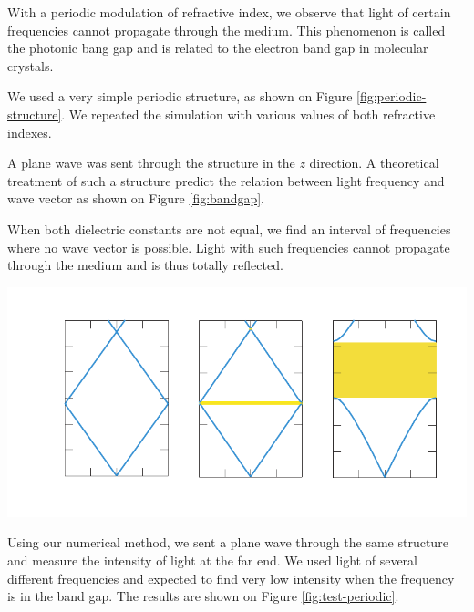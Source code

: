 \documentclass[a4paper,10pt]{article}
\renewenvironment{figure}
  {\par\medskip\noindent\minipage{\linewidth}}
  {\endminipage\par\medskip}
\begin{document}
\begin{multicols}{2}
With a periodic modulation of refractive index, we observe that light of certain frequencies cannot propagate through the medium\cite{hecht-nano,joannopoulos}. 
This phenomenon is called the photonic bang gap and is related to the electron band gap in molecular crystals. 

We used a very simple periodic structure, as shown on Figure \ref{fig:periodic-structure}. 
We repeated the simulation with various values of both refractive indexes. 

\begin{figure}
 \centering
  \resizebox{\textwidth}{!}{}
  \label{fig:periodic-structure}
\end{figure}

A plane wave was sent through the structure in the $z$ direction. 
A theoretical treatment of such a structure predict the relation between light frequency and wave vector as shown on Figure \ref{fig:bandgap}. 

When both dielectric constants are not equal, we find an interval of frequencies where no wave vector is possible. 
Light with such frequencies cannot propagate through the medium and is thus totally reflected. 

\begin{figure}
 \centering
 \includegraphics[width=\textwidth]{bandgap}
  \label{fig:bandgap}
\end{figure}

Using our numerical method, we sent a plane wave through the same structure and measure the intensity of light at the far end. 
We used light of several different frequencies and expected to find very low intensity when the frequency is in the band gap. 
The results are shown on Figure \ref{fig:test-periodic}. 


\end{multicols}
\end{document}
